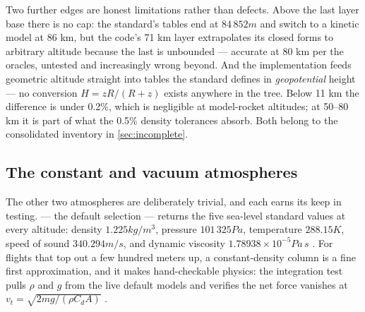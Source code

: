 Two further edges are honest limitations rather than defects. Above the last layer base
there is no cap: the standard's tables end at $84\,852\unit{m}$ and switch to a kinetic
model at 86 km, but the code's 71 km layer extrapolates its closed forms to arbitrary
altitude because the last  is unbounded  --- accurate at 80
km per the oracles, untested and increasingly wrong beyond. And the implementation feeds
geometric altitude straight into tables the standard defines in \emph{geopotential} height
--- no conversion $H = zR/(R + z)$ exists anywhere in the tree. Below 11 km the difference
is under 0.2\%, which is negligible at model-rocket altitudes; at 50--80 km it is part of
what the 0.5\% density tolerances absorb. Both belong to the consolidated inventory in
\cref{sec:incomplete}.

\subsection{The constant and vacuum atmospheres}\label{sec:environment-simple}

The other two atmospheres are deliberately trivial, and each earns its keep in testing.
 --- the default selection --- returns the five sea-level standard
values at every altitude: density $1.225\unit{kg/m^3}$, pressure $101\,325\unit{Pa}$,
temperature $288.15\unit{K}$, speed of sound $340.294\unit{m/s}$, and dynamic viscosity
$1.78938\times10^{-5}\unit{Pa\,s}$ . For flights that top
out a few hundred meters up, a constant-density column is a fine first approximation, and it
makes hand-checkable physics: the  integration test pulls
$\rho$ and $g$ from the live default models and verifies the net force vanishes at
$v_t = \sqrt{2mg/(\rho C_d A)}$ .

